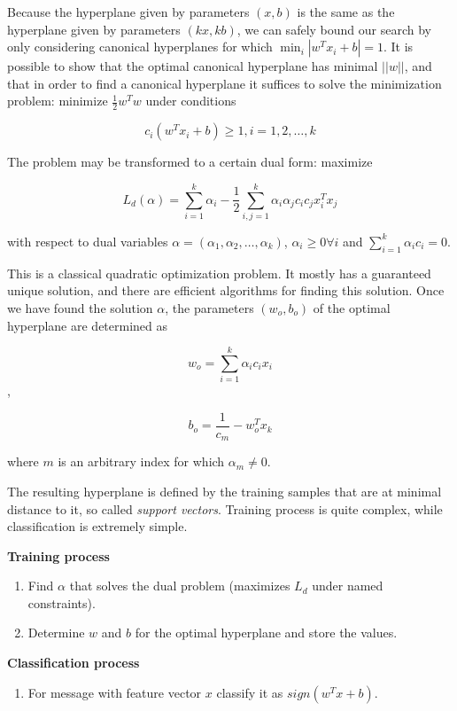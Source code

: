 \documentclass[12pt]{report}
\begin{document}
Because the hyperplane given by parameters $(x, b)$ is the same as the hyperplane given by parameters $(kx, kb)$, we can safely bound our search by only considering canonical hyperplanes for which $\min_i |w^T x_i + b| = 1$. It is possible to show that the optimal canonical hyperplane has minimal $||w||$, and that in order to find a canonical hyperplane it suffices to solve the minimization problem: minimize $\frac{1}{2} w^T w$ under conditions

$$c_i(w^T x_i + b) \ge 1, i = 1, 2, \dots, k$$

The problem may be transformed to a certain dual form: maximize

$$L_d(\alpha) = \sum_{i = 1}^{k} \alpha_i - \frac{1}{2} \sum_{i, j = 1}^{k} \alpha_i \alpha_j c_i c_j x_i^T x_j$$

with respect to dual variables $\alpha = (\alpha_1, \alpha_2, \dots, \alpha_k)$, $\alpha_i \ge 0 \forall i$ and $\sum_{i = 1}^{k} \alpha_i c_i = 0$.

This is a classical quadratic optimization problem. It mostly has a guaranteed unique solution, and there are efficient algorithms for finding this solution. Once we have found the solution $\alpha$, the parameters $(w_o, b_o)$ of the optimal hyperplane are determined as

$$w_o = \sum_{i = 1}^{k} \alpha_i c_i x_i$$,

$$b_o = \frac{1}{c_m} - w_o^T x_k$$

where $m$ is an arbitrary index for which $\alpha_m \ne 0$.

The resulting hyperplane is defined by the training samples that are at minimal distance to it, so called \textit{support vectors}. Training process is quite complex, while classification is extremely simple.

\textbf{Training process}

\begin{enumerate}
	\item Find $\alpha$ that solves the dual problem (maximizes $L_d$ under named
	constraints).
	\item Determine $w$ and $b$ for the optimal hyperplane and store the values.
\end{enumerate}

\textbf{Classification process}

\begin{enumerate}
	\item For message with feature vector $x$ classify it as $sign(w^T x + b)$.
\end{enumerate}
\end{document}
